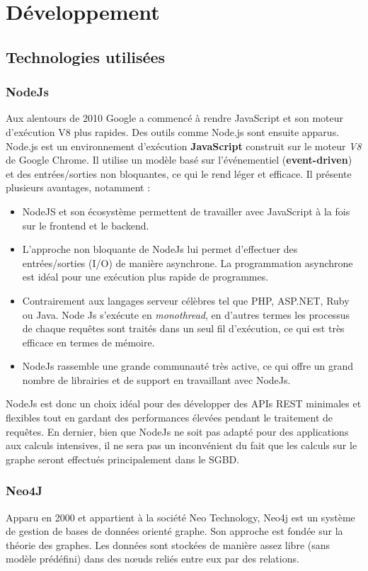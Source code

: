 \chapter{Développement}
\section{Technologies utilisées}
\subsection{NodeJs}
Aux alentours de 2010 Google a commencé à rendre JavaScript et son moteur d'exécution V8 plus rapides. Des outils comme Node.js sont ensuite apparus\cite{NodeJs}.\newline
Node.js est un environnement d'exécution \textbf{JavaScript} construit sur le moteur \emph{V8} de Google Chrome. Il utilise un modèle basé sur l'événementiel (\textbf{event-driven}) et des entrées/sorties non bloquantes, ce qui le rend léger et efficace.
Il présente plusieurs avantages, notamment :
\begin{itemize}
	\item NodeJS et son écosystème permettent de travailler avec JavaScript à la fois sur le frontend et le backend.
	\item L'approche non bloquante de NodeJs lui permet d'effectuer des entrées/sorties (I/O) de manière asynchrone. La programmation asynchrone est idéal pour une exécution plus rapide de programmes.
	\item Contrairement aux langages serveur célèbres tel que PHP, ASP.NET, Ruby ou Java. Node Js s'exécute en \emph{monothread}, en d'autres termes les processus de chaque requêtes sont traités dans un seul fil d'exécution, ce qui est très efficace en termes de mémoire.
	\item NodeJs rassemble une grande communauté très active, ce qui offre un grand nombre de librairies et de support en travaillant avec NodeJs.\newline
\end{itemize}
NodeJs est donc un choix idéal pour des développer des APIs REST minimales et flexibles tout en gardant des performances élevées pendant le traitement de requêtes.\newline
En dernier, bien que NodeJs ne soit pas adapté pour des applications aux calculs intensives, il ne sera pas un inconvénient du fait que les calculs sur le graphe seront effectués principalement dans le SGBD.
\subsection{Neo4J}
Apparu en 2000 et appartient à la société Neo Technology, Neo4j est un système de gestion de bases de données orienté graphe. Son approche est fondée sur la théorie des graphes. Les données sont stockées de manière assez libre (sans modèle prédéfini) dans des nœuds reliés entre eux par des relations.

